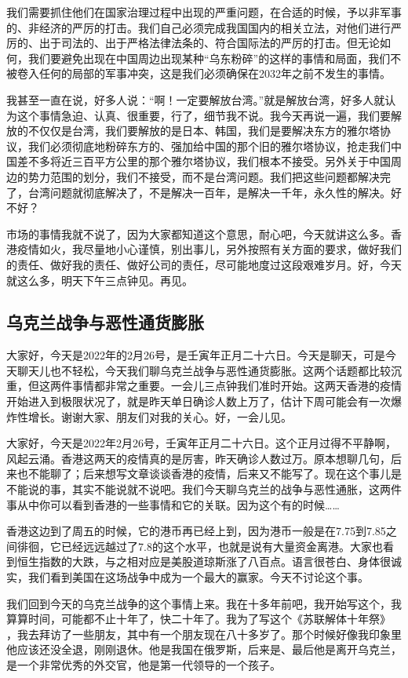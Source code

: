 \documentclass[UTF8, 12pt, a4paper]{ctexrep}
\begin{document}
我们需要抓住他们在国家治理过程中出现的严重问题，在合适的时候，予以非军事的、非经济的严厉的打击。我们自己必须完成我国国内的相关立法，对他们进行严厉的、出于司法的、出于严格法律法条的、符合国际法的严厉的打击。但无论如何，我们要避免出现在中国周边出现某种“乌东粉碎”的这样的事情和局面，我们不被卷入任何的局部的军事冲突，这是我们必须确保在2032年之前不发生的事情。

我甚至一直在说，好多人说：“啊！一定要解放台湾。”就是解放台湾，好多人就认为这个事情急迫、认真、很重要，行了，细节我不说。我今天再说一遍，我们要解放的不仅仅是台湾，我们要解放的是日本、韩国，我们是要解决东方的雅尔塔协议，我们必须彻底地粉碎东方的、强加给中国的那个旧的雅尔塔协议，抢走我们中国差不多将近三百平方公里的那个雅尔塔协议，我们根本不接受。另外关于中国周边的势力范围的划分，我们不接受，而不是台湾问题。我们把这些问题都解决完了，台湾问题就彻底解决了，不是解决一百年，是解决一千年，永久性的解决。好不好？

市场的事情我就不说了，因为大家都知道这个意思，耐心吧，今天就讲这么多。香港疫情如火，我尽量地小心谨慎，别出事儿，另外按照有关方面的要求，做好我们的责任、做好我的责任、做好公司的责任，尽可能地度过这段艰难岁月。好，今天就这么多，明天下午三点钟见。再见。

\subsection{乌克兰战争与恶性通货膨胀}

大家好，今天是2022年的2月26号，是壬寅年正月二十六日。今天是聊天，可是今天聊天儿也不轻松，今天我们聊乌克兰战争与恶性通货膨胀。这两个话题都比较沉重，但这两件事情都非常之重要。一会儿三点钟我们准时开始。这两天香港的疫情开始进入到极限状况了，就是昨天单日确诊人数上万了，估计下周可能会有一次爆炸性增长。谢谢大家、朋友们对我的关心。好，一会儿见。

大家好，今天是2022年2月26号，壬寅年正月二十六日。这个正月过得不平静啊，风起云涌。香港这两天的疫情真的是厉害，昨天确诊人数过万。原本想聊几句，后来也不能聊了；后来想写文章谈谈香港的疫情，后来又不能写了。现在这个事儿是不能说的事，其实不能说就不说吧。我们今天聊乌克兰的战争与恶性通胀，这两件事从中你可以看到香港的一些事情和它的关联。因为这个有的时候……

香港这边到了周五的时候，它的港币再已经上到，因为港币一般是在7.75到7.85之间徘徊，它已经远远越过了7.8的这个水平，也就是说有大量资金离港。大家也看到恒生指数的大跌，与之相对应是美股道琼斯涨了八百点。语言很苍白、身体很诚实，我们看到美国在这场战争中成为一个最大的赢家。今天不讨论这个事。

我们回到今天的乌克兰战争的这个事情上来。我在十多年前吧，我开始写这个，我算算时间，可能都不止十年了，快二十年了。我为了写这个《苏联解体十年祭》 ，我去拜访了一些朋友，其中有一个朋友现在八十多岁了。那个时候好像我印象里他应该还没全退，刚刚退休。他是我国在俄罗斯，后来是、最后他是离开乌克兰，是一个非常优秀的外交官，他是第一代领导的一个孩子。
\end{document}
